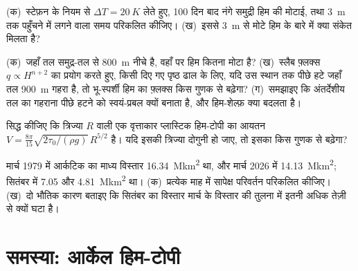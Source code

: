 \begin{exercise}[$\star\star$]\label{exo:b3:glaciology:9}
(क)~स्टेफ़न के नियम से $\Delta T = \qty{20}{K}$ लेते हुए, 100 दिन बाद नंगे समुद्री हिम की
मोटाई, तथा \qty{3}{m} तक पहुँचने में लगने वाला समय परिकलित कीजिए।
(ख)~इससे \qty{3}{m} से मोटे हिम के बारे में क्या संकेत मिलता है?
\end{exercise}

\begin{exercise}[$\star\star\star$]\label{exo:b3:glaciology:10}
(क)~जहाँ तल समुद्र-तल से \qty{800}{m} नीचे है, वहाँ  पर हिम कितना
मोटा है? (ख)~स्लैब फ़्लक्स $q \propto H^{n+2}$ का प्रयोग करते हुए, किसी दिए गए
पृष्ठ ढाल के लिए, यदि  उस स्थान तक पीछे हटे जहाँ तल \qty{900}{m} गहरा है,
तो भू-स्पर्शी हिम का फ़्लक्स किस गुणक से बढ़ेगा? (ग)~समझाइए कि
अंतर्देशीय तल का गहराना पीछे हटने को स्वयं-प्रबल क्यों बनाता है,
और हिम-शेल्फ़ क्या बदलता है।
\end{exercise}

\begin{exercise}[$\star\star\star$]\label{exo:b3:glaciology:11}
सिद्ध कीजिए कि त्रिज्या $R$ वाली एक वृत्ताकार प्लास्टिक हिम-टोपी का आयतन $V =
\frac{8\pi}{15}\sqrt{2\tau_0/(\rho g)}\,R^{5/2}$ है। यदि इसकी त्रिज्या दोगुनी हो जाए,
तो इसका  किस गुणक से बढ़ेगा?
\end{exercise}

\begin{exercise}[$\star\star\star$]\label{exo:b3:glaciology:12}
मार्च 1979 में आर्कटिक का माध्य विस्तार \qty{16.34}{\mega km^2} था, और
मार्च 2026 में \qty{14.13}{\mega km^2}; सितंबर में \num{7.05} और
\qty{4.81}{\mega km^2} था। (क)~प्रत्येक माह में सापेक्ष परिवर्तन परिकलित कीजिए।
(ख)~दो भौतिक कारण बताइए कि सितंबर का विस्तार
मार्च के विस्तार की तुलना में इतनी अधिक तेज़ी से क्यों घटा है।
\end{exercise}

\section{समस्या: आर्केल हिम-टोपी}

